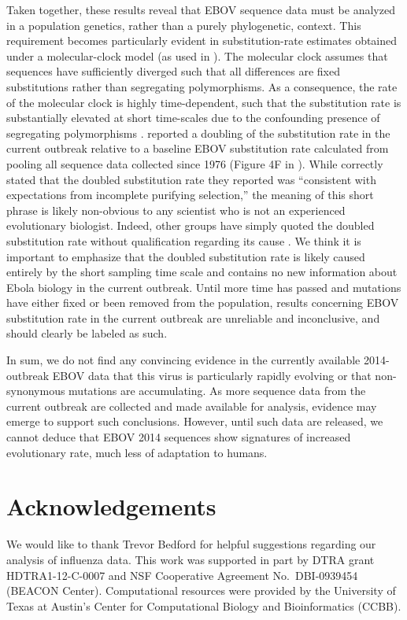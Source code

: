 \documentclass[11pt]{article}
\begin{document}
Taken together, these results reveal that EBOV sequence data must be analyzed in a population genetics, rather than a purely phylogenetic, context. This requirement becomes particularly evident in substitution-rate estimates obtained under a molecular-clock model (as used in \citealt{Gire2014}). The molecular clock assumes that sequences have sufficiently diverged such that all differences are fixed substitutions rather than segregating polymorphisms. As a consequence, the rate of the molecular clock is highly time-dependent, such that the substitution rate is substantially elevated at short time-scales due to the confounding presence of segregating polymorphisms \citep{Hoetal2005, Hoetal2007, PetersonMasel2009, Hoetal2011}. \citet{Gire2014} reported a doubling of the substitution rate in the current outbreak relative to a baseline EBOV substitution rate calculated from pooling all sequence data collected since 1976 (Figure 4F in \citealt{Gire2014}). While \citet{Gire2014} correctly stated that the doubled substitution rate they reported was ``consistent with expectations from incomplete purifying selection,'' the meaning of this short phrase is likely non-obvious to any scientist who is not an experienced evolutionary biologist. Indeed, other groups have simply quoted the doubled substitution rate without qualification regarding its cause \citep{Alexanderetal2014}. We think it is important to emphasize that the doubled substitution rate is likely caused entirely by the short sampling time scale and contains no new information about Ebola biology in the current outbreak. Until more time has passed and mutations have either fixed or been removed from the population, results concerning EBOV substitution rate in the current outbreak are unreliable and inconclusive, and should clearly be labeled as such.

In sum, we do not find any convincing evidence in the currently available 2014-outbreak EBOV data that this virus is particularly rapidly evolving or that non-synonymous mutations are accumulating. As more sequence data from the current outbreak are collected and made available for analysis, evidence may emerge to support such conclusions. However, until such data are released, we cannot deduce that EBOV 2014 sequences show signatures of increased evolutionary rate, much less of adaptation to humans.

\section*{Acknowledgements}
We would like to thank Trevor Bedford for helpful suggestions regarding our analysis of influenza data. This work was supported in part by DTRA grant HDTRA1-12-C-0007 and NSF Cooperative Agreement No.\ DBI-0939454 (BEACON Center). Computational resources were provided by the University of Texas at Austin's Center for Computational Biology and Bioinformatics (CCBB).
\end{document}
